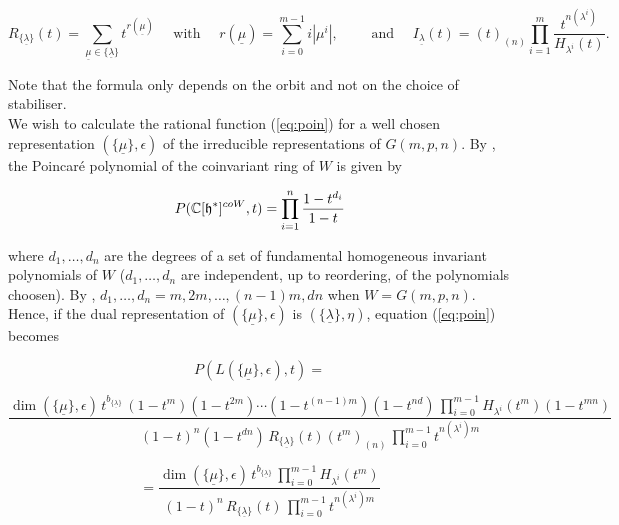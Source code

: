 \documentclass[a4apper,10pt]{amsart}
\theoremstyle{definition}
\numberwithin{thm}{section}
\newcommand{\C}{\mathbb{C}}
\begin{document}
\begin{displaymath}
R_{\{ \underline{\lambda} \} }(t) = \sum_{\underline{\mu} \in \{ \underline{\lambda} \} } t^{r(\underline{\mu})} \quad \text{ with } \quad r(\underline{\mu}) = \sum_{i = 0}^{m-1} i|\mu^i|, \qquad \text{ and } \quad I_{\underline{\lambda}}(t) = (t)_{(n)} \prod_{i = 1}^m \frac{t^{n(\lambda^i)}}{H_{\lambda^i}(t)}.
\end{displaymath}

\noindent Note that the formula only depends on the orbit and not on the choice of stabiliser.\\

\noindent We wish to calculate the rational function (\ref{eq:poin})
for a well chosen representation $(\{ \underline{\mu} \},\epsilon)$ of the irreducible representations of $G(m,p,n)$. By \cite[Theorem 3.15]{4}, the Poincar\'e polynomial of the coinvariant ring of $W$ is given by

\begin{displaymath}
P(\C[\frak{h}^*]^{coW},t) = \prod_{i = 1}^{n} \frac{1 - t^{d_i}}{1-t}
\end{displaymath}

\noindent where $d_1, \dots , d_n$ are the degrees of a set of
fundamental homogeneous invariant polynomials of $W$ ($d_1, \dots ,
d_n$ are independent, up to reordering, of the polynomials choosen). By \cite[page 291]{5}, $d_1, \dots, d_n = m,2m, \dots , (n-1)m,dn$ when $W = G(m,p,n)$.\\

\noindent Hence, if the dual representation of $( \{ \underline{ \mu }
\}, \epsilon)$ is $( \{ \underline{ \lambda } \}, \eta)$, equation (\ref{eq:poin}) becomes


\begin{displaymath}
P(L(\{ \underline{\mu} \},\epsilon),t) =
\end{displaymath}

\begin{displaymath}
\frac{\dim ( \{ \underline{\mu} \},\epsilon) \, t^{b_{ \{ \underline{ \lambda } \} }} \, (1 - t^m)(1 - t^{2m}) \cdots (1 - t^{(n-1)m})(1 - t^{nd}) \, \prod_{i=0}^{m-1} H_{\lambda^i}(t^m) (1 - t^{mn})}{(1-t)^n(1 - t^{dn}) \, R_{ \{ \underline{\lambda} \}}(t)(t^m)_{(n)} \, \prod_{i = 0}^{m-1} t^{n(\lambda^i)m} } 
\end{displaymath}

\begin{equation}\label{eq:red2}
= \frac{\dim ( \{ \underline{\mu} \},\epsilon) \,  t^{b_{ \{ \underline{\lambda} \} }} \, \prod_{i=0}^{m-1} H_{\lambda^i}(t^m)}{(1 - t)^n \, R_{ \{ \underline{\lambda} \}}(t) \, \prod_{i = 0}^{m-1} t^{n(\lambda^i)m}}
\end{equation}
\end{document}
